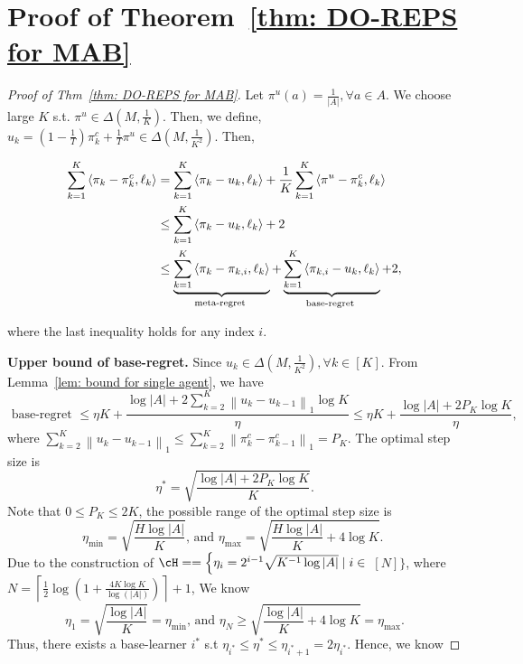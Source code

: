 \documentclass[11pt]{article}
\begin{document}
\section{Proof of Theorem~\ref{thm: DO-REPS for MAB}}

\begin{proof}[Proof of Thm~\ref{thm: DO-REPS for MAB}]
    Let $\pi^u(a) = \frac{1}{|A|}, \forall a\in A$. We choose large $K$ s.t. $\pi^u \in \Delta(M, \frac{1}{K})$. Then, we define, $u_k = (1-\frac{1}{T})\pi_k^c + \frac{1}{T}\pi^u \in \Delta(M, \frac{1}{K^2})$. Then, 
    
        \begin{align}
            \sum_{k=1}^K\left\langle \pi_k-\pi_k^c, \ell_k\right\rangle &=\sum_{k=1}^K\left\langle \pi_k-u_k, \ell_k\right\rangle+\frac{1}{K} \sum_{k=1}^K\left\langle \pi^u-\pi_k^c, \ell_k\right\rangle \notag\\
            & \leq \sum_{k=1}^K\left\langle \pi_k-u_k, \ell_k\right\rangle+2 \notag\\
            & \leq \underbrace{\sum_{k=1}^K\left\langle \pi_k-\pi_{k, i}, \ell_k\right\rangle}_{\text {meta-regret }}+\underbrace{\sum_{k=1}^K\left\langle \pi_{k, i}-u_k, \ell_k\right\rangle}_{\text {base-regret }}+2, \label{eq: decomposition} 
            \end{align}
    
    where the last inequality holds for any index $i$. 
    
    \noindent \textbf{Upper bound of base-regret. } 
    Since $u_k\in \Delta(M, \frac{1}{K^2}), \forall k \in [K]$. From Lemma~\ref{lem: bound for single agent}, we have 
    \[
        \text { base-regret } \leq \eta K+\frac{\log |A| +2 \sum_{k=2}^K\left\|u_k-u_{k-1}\right\|_1 \log K}{\eta} \leq \eta K+\frac{\log |A|+2 P_K \log K}{\eta} \text {, }
    \]
    where $\sum_{k=2}^K\left\|u_k-u_{k-1}\right\|_1 \leq \sum_{k=2}^K\left\|{\pi_k^c}-{\pi_{k-1}^c}\right\|_1= P_K$. The optimal step size is 
    \[
        \eta^* = \sqrt{\frac{\log |A|+2 P_K \log K}{K}}. 
    \]
    Note that $0\le P_K \le 2K$,  the possible range of the optimal step size is 
    \[
        \eta_{\min }=\sqrt{\frac{H \log |A|}{K}} \text {, and } \eta_{\max }=\sqrt{\frac{H \log |A|}{K}+4 \log K} \text {. }
    \]
    Due to the construction of $\cH = =\left\{\eta_i=2^{i-1} \sqrt{K^{-1} \log |A|} \mid i \in\right.$
    $[N]\}$, where $N=\left\lceil\frac{1}{2} \log \left(1+\frac{4 K \log K}{\log (|A| )}\right)\right\rceil+1$, We know 
    \[
        \eta_1=\sqrt{\frac{ \log |A|}{K}}=\eta_{\min } \text {, and } \eta_N \geq \sqrt{\frac{ \log |A|}{K}+4 \log K}=\eta_{\max } .
    \]
    Thus, there exists a base-learner $i^*$ s.t $\eta_{i^*} \leq \eta^* \leq \eta_{i^*+1}=2 \eta_{i^*}$. Hence, we know 
    

\end{proof}
\end{document}
